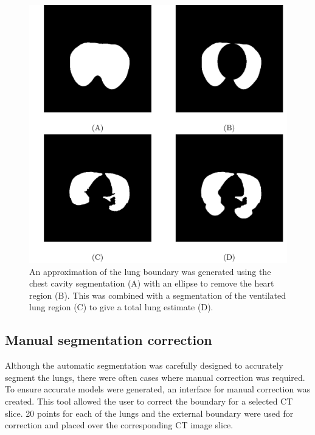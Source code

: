 \begin{figure}
	\centering
	\includegraphics[width=\textwidth]{chapter5-CT_to_mesh/imgs/lung_seg_methods.pdf}
	\caption[Lung segmentation methods.]{\label{fig:lung_seg_methods}%
	An approximation of the lung boundary was generated using the chest cavity segmentation
	(A) with an ellipse to remove the heart region (B).
	This was combined with a segmentation of the ventilated lung region (C) 
	to give a total lung estimate (D).
	}
\end{figure}

\subsection{Manual segmentation correction}  \label{sec:correct-segment}
Although the automatic segmentation was carefully designed to accurately segment the 
lungs, there were often cases where manual correction was required. To ensure accurate
models were generated, an interface for manual correction was created. 
This tool allowed the user to correct the boundary for a selected CT slice. 
20 points for each of the lungs and the external 
boundary were used for correction and placed over 
the corresponding CT image slice.


